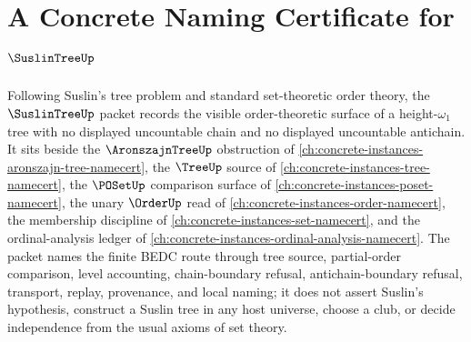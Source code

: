 \chapter{A Concrete Naming Certificate for $\SuslinTreeUp$}
\label{ch:concrete-instances-suslin-tree-namecert}

Following Suslin's tree problem and standard set-theoretic order theory, the $\SuslinTreeUp$ packet records the visible order-theoretic surface of a height-$\omega_1$ tree with no displayed uncountable chain and no displayed uncountable antichain. It sits beside the $\AronszajnTreeUp$ obstruction of \autoref{ch:concrete-instances-aronszajn-tree-namecert}, the $\TreeUp$ source of \autoref{ch:concrete-instances-tree-namecert}, the $\POSetUp$ comparison surface of \autoref{ch:concrete-instances-poset-namecert}, the unary $\OrderUp$ read of \autoref{ch:concrete-instances-order-namecert}, the membership discipline of \autoref{ch:concrete-instances-set-namecert}, and the ordinal-analysis ledger of \autoref{ch:concrete-instances-ordinal-analysis-namecert}. The packet names the finite BEDC route through tree source, partial-order comparison, level accounting, chain-boundary refusal, antichain-boundary refusal, transport, replay, provenance, and local naming; it does not assert Suslin's hypothesis, construct a Suslin tree in any host universe, choose a club, or decide independence from the usual axioms of set theory.

